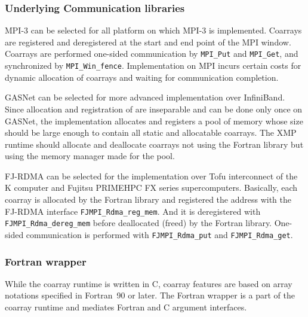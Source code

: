 \subsubsection{Underlying Communication libraries}

MPI-3 can be selected for all platform on which MPI-3 is implemented. Coarrays are 
registered and deregistered at the start and end point of the MPI window. 
Coarrays are performed one-sided communication by {\tt MPI\_Put} and {\tt MPI\_Get},
and synchronized by {\tt MPI\_Win\_fence}. 
Implementation on MPI incurs certain costs for dynamic allocation of coarrays and 
waiting for communication completion.

GASNet can be selected for more advanced implementation over InfiniBand. 
Since allocation and registration of are inseparable and can be done only once 
on GASNet, the implementation allocates and registers a pool of memory
whose size should be large enough to contain all static and allocatable coarrays.
The XMP runtime should allocate and deallocate coarrays not using the Fortran 
library but using the memory manager made for the pool.

FJ-RDMA can be selected for the implementation over Tofu interconnect of 
the K computer and Fujitsu PRIMEHPC FX series supercomputers. 
Basically, each coarray is allocated by the Fortran library and registered 
the address with the FJ-RDMA interface {\tt FJMPI\_Rdma\_reg\_mem}. 
And it is deregistered with {\tt FJMPI\_Rdma\_dereg\_mem} before deallocated 
(freed) by the Fortran library. 
One-sided communication is performed with {\tt FJMPI\_Rdma\_put} and 
{\tt FJMPI\_Rdma\_get}.


\subsubsection{Fortran wrapper}

While the coarray runtime is written in C, coarray features are 
based on array notations specified in Fortran~90 or later.
The Fortran wrapper is a part of the coarray runtime and mediates
Fortran and C argument interfaces.


